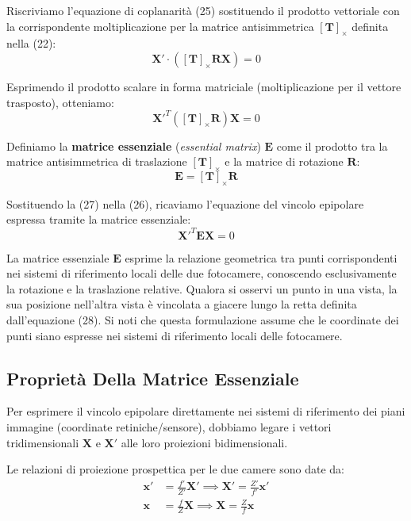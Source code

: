 ﻿\documentclass[11pt, a4paper]{article}
\begin{document}
Riscriviamo l'equazione di coplanarità (25) sostituendo il prodotto vettoriale con la corrispondente moltiplicazione per la matrice antisimmetrica $[\bm{T}]_{\times}$ definita nella (22):
\[
\bm{X}' \cdot \left( [\bm{T}]_{\times} \bm{R} \bm{X} \right) = 0
\]

Esprimendo il prodotto scalare in forma matriciale (moltiplicazione per il vettore trasposto), otteniamo:
\begin{equation}
\bm{X}'^T \left( [\bm{T}]_{\times} \bm{R} \right) \bm{X} = 0
\end{equation}

Definiamo la \textbf{matrice essenziale} (\emph{essential matrix}) $\bm{E}$ come il prodotto tra la matrice antisimmetrica di traslazione $[\bm{T}]_{\times}$ e la matrice di rotazione $\bm{R}$:
\begin{equation}
\bm{E} = [\bm{T}]_{\times} \bm{R}
\end{equation}

Sostituendo la (27) nella (26), ricaviamo l'equazione del vincolo epipolare espressa tramite la matrice essenziale:
\begin{equation}
\boxed{\bm{X}'^T \bm{E} \bm{X} = 0}
\end{equation}


La matrice essenziale $\bm{E}$ esprime la relazione geometrica tra punti corrispondenti nei sistemi di riferimento locali delle due fotocamere, conoscendo esclusivamente la rotazione e la traslazione relative. Qualora si osservi un punto in una vista, la sua posizione nell'altra vista è vincolata a giacere lungo la retta definita dall'equazione (28). Si noti che questa formulazione assume che le coordinate dei punti siano espresse nei sistemi di riferimento locali delle fotocamere.



\subsection{Proprietà Della Matrice Essenziale}

Per esprimere il vincolo epipolare direttamente nei sistemi di riferimento dei piani immagine (coordinate retiniche/sensore), dobbiamo legare i vettori tridimensionali $\bm{X}$ e $\bm{X}'$ alle loro proiezioni bidimensionali.

Le relazioni di proiezione prospettica per le due camere sono date da:
\begin{align*}
\bm{x}' &= \frac{f'}{Z'} \bm{X}' \implies \bm{X}' = \frac{Z'}{f'} \bm{x}' \\
\bm{x} &= \frac{f}{Z} \bm{X} \implies \bm{X} = \frac{Z}{f} \bm{x}
\end{align*}
\end{document}
